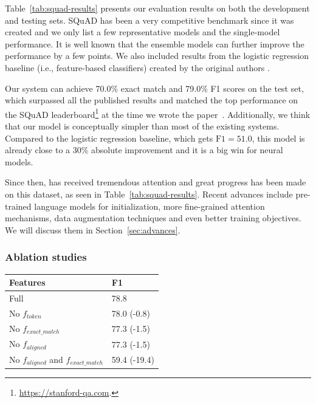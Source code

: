 Table~\ref{tab:squad-results} presents our evaluation results on both the development and testing sets. SQuAD has been a very competitive benchmark since it was created and we only list a few representative models and the single-model performance. It is well known that the ensemble models can further improve the performance by a few points. We also included results from the logistic regression baseline (i.e., feature-based classifiers) created by the original authors \cite{rajpurkar2016squad}.


Our system can achieve 70.0\% exact match and 79.0\% F1 scores on the test set, which surpassed all the published results and matched the top performance on the SQuAD leaderboard\footnote{\href{https://stanford-qa.com}{https://stanford-qa.com}.} at the time we wrote the paper~\cite{chen2017reading}. Additionally, we think that our model is conceptually simpler than most of the existing systems. Compared to the logistic regression baseline, which gets $\text{F1} = 51.0$, this model is already close to a 30\% absolute improvement and it is a big win for neural models.

Since then,  has received tremendous attention and great progress has been made on this dataset, as seen in Table~\ref{tab:squad-results}. Recent advances include pre-trained language models for initialization, more fine-grained attention mechanisms, data augmentation techniques and even better training objectives. We will discuss them in Section~\ref{sec:advances}.


\subsubsection{Ablation studies}

\begin{table}[h]
	\begin{center}
	\begin{tabular}{l | l}
    \hline
    \bf Features & \bf F1\\
    \hline
    Full & 78.8 \\
    \hline
    No $f_{token}$ & 78.0 (-0.8)\\
    No $f_{exact\_match}$ & 77.3 (-1.5)\\
    No $f_{aligned}$ & 77.3 (-1.5)\\
    No $f_{aligned}$ and $f_{exact\_match}$ & 59.4 (-19.4) \\
    \hline
    \end{tabular}
    \end{center}
\end{table}

